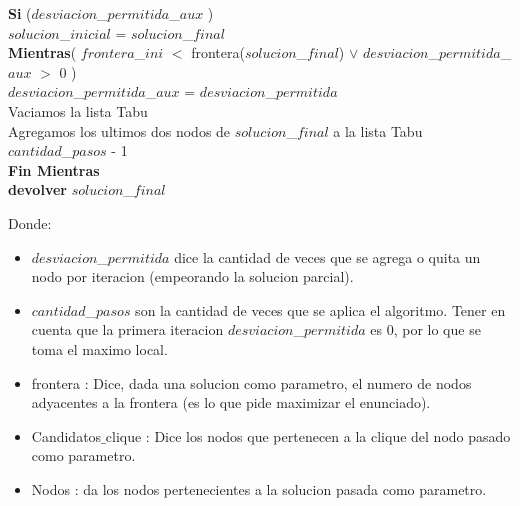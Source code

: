 \begin{algorithm}[H]
	\hspace{8mm} \textbf{Si} ($desviacion$\_$permitida$\_$aux$ ) \\
	\hspace{12mm} $solucion$\_$inicial$ = $solucion$\_$final$ \\
	\hspace{4mm} \textbf{Mientras}( $frontera$\_$ini$ $<$ frontera($solucion$\_$final$)  $\vee$ $desviacion$\_$permitida$\_$aux$ $>$ 0 ) \\
	\hspace{4mm} $desviacion$\_$permitida$\_$aux$ = $desviacion$\_$permitida$  \\
	\hspace{4mm} Vaciamos la lista Tabu \\
	\hspace{4mm} Agregamos los ultimos dos nodos de $solucion$\_$final$ a la lista Tabu \\
	\hspace{4mm} $cantidad$\_$pasos$ - 1 \\
 	\textbf{Fin Mientras} \\
    	\textbf{devolver} $solucion$\_$final$ \\
		
\end{algorithm}

Donde:
\begin{itemize}
 \item $desviacion$\_$permitida$ dice la cantidad de veces que se agrega o quita un nodo por iteracion (empeorando la solucion parcial).
 \item $cantidad$\_$pasos$ son la cantidad de veces que se aplica el algoritmo. Tener en cuenta que la primera iteracion $desviacion$\_$permitida$ es 0, por lo que se toma el maximo local.
 \item frontera : Dice, dada una solucion como parametro, el numero de nodos adyacentes a la frontera (es lo que pide maximizar el enunciado).
 \item Candidatos$\_$clique : Dice los nodos que pertenecen a la clique del nodo pasado como parametro.
 \item Nodos : da los nodos pertenecientes a la solucion pasada como parametro.
\end{itemize}
